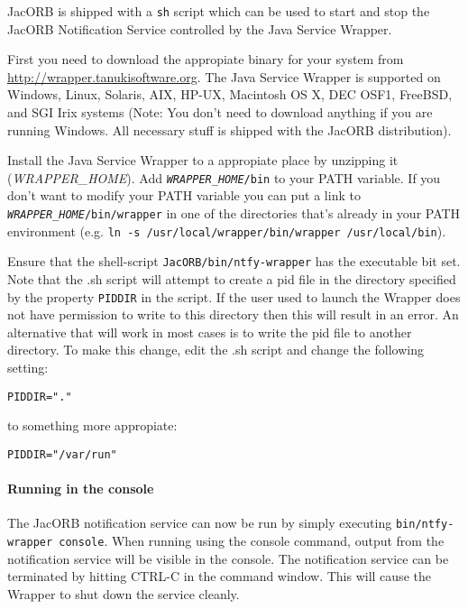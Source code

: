JacORB is shipped with a \texttt{sh} script which can be used to start
and stop the JacORB Notification Service controlled by the Java
Service Wrapper.

First you need to download the appropiate binary for your system from
\href{http://wrapper.tanukisoftware.org}{http://wrapper.tanukisoftware.org}.
The Java Service Wrapper is supported on Windows, Linux, Solaris, AIX,
HP-UX, Macintosh OS X, DEC OSF1, FreeBSD, and SGI Irix systems (Note:
You don't need to download anything if you are running Windows. All
necessary stuff is shipped with the JacORB distribution).

Install the Java Service Wrapper to a appropiate place by unzipping it
(\emph{WRAPPER\_HOME}). Add
\texttt{\emph{WRAPPER\_HOME}/bin} to your PATH variable. If you don't
want to modify your PATH variable you can put a link to
\texttt{\emph{WRAPPER\_HOME}/bin/wrapper} in one of the directories
that's already in your PATH environment (e.g. \texttt{ln -s
  /usr/local/wrapper/bin/wrapper /usr/local/bin}).

Ensure that the shell-script
\texttt{JacORB/bin/ntfy-wrapper} has the executable bit set. Note that
the .sh script will attempt to create a pid file in the directory
specified by the property \texttt{PIDDIR} in the script. If
the user used to launch the Wrapper does not have permission to write
to this directory then this will result in an error. An alternative
that will work in most cases is to write the pid file to another
directory. To make this change, edit the .sh script and change the following setting:

\begin{verbatim}
PIDDIR="."
\end{verbatim}
to something more appropiate:
\begin{verbatim}
PIDDIR="/var/run"
\end{verbatim}

\paragraph{Running in the console}
\label{sec:running-console}

 The JacORB notification service  can now be run by simply executing
 \texttt{bin/ntfy-wrapper console}.
When running using the console command, output from the notification
 service will be visible in the console.
 The notification service can be terminated by hitting CTRL-C in the command
 window. This will cause the Wrapper to shut down the service cleanly.

